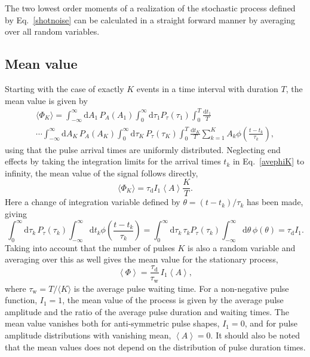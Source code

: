 \documentclass[aps,prb,12pt,a4paper,preprint,amsmath,amssymb,groupedaddress]{revtex4-1}
\newcommand{\ave}[1]{{\left<#1\right>}}
\newcommand{\rmd}{\text{d}}
\newcommand{\taud}{\ensuremath{\tau_\text{d}}}
\newcommand{\tauw}{\ensuremath{\tau_\text{w}}}
\newcommand{\Eqref}[1]{Eq.~\eqref{#1}}
\begin{document}
The two lowest order moments of a realization of the stochastic process defined by \Eqref{shotnoise} can be calculated in a straight forward manner by averaging over all random variables.\cite{garcia-prl,kube-php,theodorsen-php,garcia-php,theodorsen-ps,garcia-phpl,rice,parzen,pecseli}



\subsection{Mean value}



Starting with the case of exactly $K$ events in a time interval with duration $T$, the mean value is given by
\begin{multline} \label{avephiK}
\langle{\Phi_K}\rangle = \int_{-\infty}^\infty \rmd A_1\,P_A(A_1) \int_0^\infty \rmd\tau_1 P_\tau(\tau_1) \int_0^T \frac{\rmd t_1}{T}
\\
\cdots \int_{-\infty}^\infty \rmd A_K\,P_A(A_K) \int_0^\infty \rmd\tau_K\,P_\tau(\tau_K) \int_0^T \frac{\rmd t_K}{T} \sum_{k=1}^K A_k\phi\left( \frac{t-t_k}{\tau_k} \right) ,
\end{multline}
using that the pulse arrival times are uniformly distributed. Neglecting end effects by taking the integration limits for the arrival times $t_k$ in \Eqref{avephiK} to infinity, the mean value of the signal follows directly,
\begin{equation}
\langle{\Phi_K}\rangle = \taud I_1 \ave{A} \frac{K}{T} .
\end{equation}
Here a change of integration variable defined by $\theta=(t-t_k)/\tau_k$ has been made, giving
\begin{equation}
\int_0^\infty \rmd\tau_k\,P_\tau(\tau_k) \int_{-\infty}^\infty \rmd t_k \phi\left( \frac{t-t_k}{\tau_k} \right) = \int_0^\infty \rmd\tau_k\,\tau_k P_\tau(\tau_k) \int_{-\infty}^\infty \rmd\theta\,\phi(\theta) = \taud I_1 .
\end{equation}
Taking into account that the number of pulses $K$ is also a random variable and averaging over this as well gives the mean value for the stationary process,
\begin{equation} \label{phiave}
\ave{\Phi} = \frac{\taud}{\tauw}\,I_1\ave{A} ,
\end{equation}
where $\tauw=T/\langle{K}\rangle$ is the average pulse waiting time. For a non-negative pulse function, $I_1=1$, the mean value of the process is given by the average pulse amplitude and the ratio of the average pulse duration and waiting times. The mean value vanishes both for anti-symmetric pulse shapes, $I_1=0$, and for pulse amplitude distributions with vanishing mean, $\ave{A}=0$. It should also be noted that the mean values does not depend on the distribution of pulse duration times.
\end{document}
